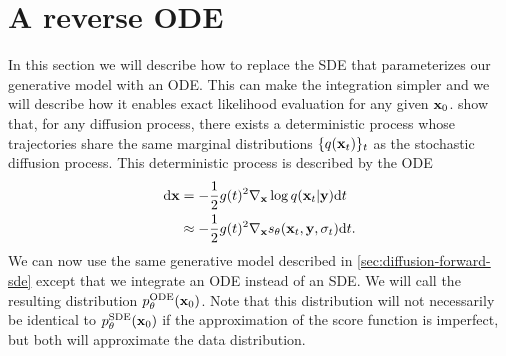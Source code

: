 
\section{A reverse ODE} \label{sec:diffusion-ode}
In this section we will describe how to replace the SDE that parameterizes our generative model with an ODE. This can make the integration simpler and we will describe how it enables exact likelihood evaluation for any given ${\mathbf{x}}_0$.  \citet{song2020score} show that, for any diffusion process, there exists a deterministic process whose trajectories share the same marginal distributions $\{q({\mathbf{x}}_t)\}_t$ as the stochastic diffusion process. This deterministic process is described by the ODE
\begin{align}
    \mathrm{d}{\mathbf{x}} &= - \frac{1}{2} g(t)^2 \nabla_{\mathbf{x}} \log q({\mathbf{x}}_t|{\mathbf{y}}) \mathrm{d}t \\
    &\approx - \frac{1}{2} g(t)^2 \nabla_{\mathbf{x}} s_\theta({\mathbf{x}}_t, {\mathbf{y}}, \sigma_t) \mathrm{d}t. \label{eq:diffusion-ode-with-nn}
\end{align}
We can now use the same generative model described in \cref{sec:diffusion-forward-sde} except that we integrate an ODE instead of an SDE. We will call the resulting distribution $p_\theta^\text{ODE}({\mathbf{x}}_0)$. Note that this distribution will not necessarily be identical to $p_\theta^\text{SDE}({\mathbf{x}}_0)$ if the approximation of the score function is imperfect, but both will approximate the data distribution.

